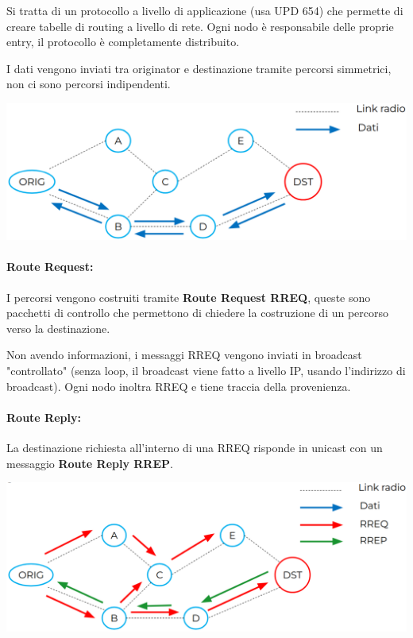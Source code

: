 Si tratta di un protocollo a livello di applicazione (usa UPD 654) che permette di creare tabelle di routing a livello di rete. Ogni nodo è responsabile delle proprie entry, il protocollo è completamente distribuito.

I dati vengono inviati tra originator e destinazione tramite percorsi simmetrici, non ci sono percorsi indipendenti.
\begin{center}
	\includegraphics[width=0.93\linewidth]{img/aodv/path1}
\end{center}

\paragraph{Route Request:} I percorsi vengono costruiti tramite \textbf{Route Request RREQ}, queste sono pacchetti di controllo che permettono di chiedere la costruzione di un percorso verso la destinazione. 

Non avendo informazioni, i messaggi RREQ vengono inviati in broadcast "controllato" (senza loop, il broadcast viene fatto a livello IP, usando l'indirizzo di broadcast). Ogni nodo inoltra RREQ e tiene traccia della provenienza.

\paragraph{Route Reply:} La destinazione richiesta all'interno di una RREQ risponde in unicast con un messaggio \textbf{Route Reply RREP}.
\begin{center}
	\includegraphics[width=0.93\linewidth]{img/aodv/path2}
\end{center}

